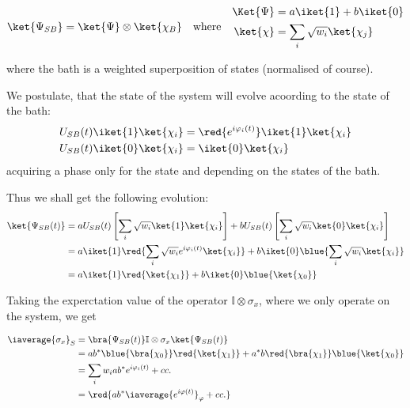    \begin{equation}\label{key}
     \ket{\Psi_{SB}} = \ket{\Psi} \otimes \ket{\chi_B} \quad\text{where}\quad
     \begin{aligned}
       \Ket{\Psi} & = a\iket{1} + b\iket{0}\\
       \ket{\chi} & = \sum_i\sqrt{w_i}\ket{\chi_j}
     \end{aligned}
   \end{equation}

   \noindent   where  the   bath   is  a   weighted  superposition   of
    states (normalised of course).

   \begin{framed}\noindent
     \noindent We postulate,  that the state of the  system will evolve
     acoording to the state of the bath:
     \begin{equation}\label{key}
       \begin{aligned}
         U_{SB}(t)\iket{1}\ket{\chi_i} & = \red{e^{i\varphi_i(t)}}\iket{1}\ket{\chi_i}\\
         U_{SB}(t)\iket{0}\ket{\chi_i} &=\iket{0}\ket{\chi_i}\\
       \end{aligned}
     \end{equation}
     \noindent  acquiring  a phase  only  for  the   state  and
     depending on the states of the bath.
   \end{framed}

   \noindent Thus we shall get the following evolution:
   \begin{equation}\label{key}
     \begin{aligned}
       \ket{\Psi_{SB}(t)} & = aU_{SB}(t)\left[\sum_i\sqrt{w_i}\ket{1}\ket{\chi_i}\right] + bU_{SB}(t)\left[\sum_i\sqrt{w_i}\ket{0}\ket{\chi_i}\right]\\
       & = a\iket{1}\red{\sum_i\sqrt{w_i}e^{i\varphi_i(t)}\ket{\chi_i}} + b\iket{0}\blue{\sum_i\sqrt{w_i}\ket{\chi_i}}\\
       & = a\iket{1}\red{\ket{\chi_1}} + b\iket{0}\blue{\ket{\chi_0}}
     \end{aligned}
   \end{equation}
   \vspace{1cm}

   \noindent   Taking   the   experctation  value   of   the   operator
   $ \mathbb{I} \otimes  \sigma_x $, where we only operate  on the system, we
   get

   \begin{equation}\label{key}
     \begin{aligned}
       \iaverage{\sigma_x}_S & = \bra{\Psi_{SB}(t)}\mathbb{I} \otimes \sigma_x\ket{\Psi_{SB}(t)} \\
       & = ab^{*}\blue{\bra{\chi_0}}\red{\ket{\chi_1}} + a^{*}b\red{\bra{\chi_1}}\blue{\ket{\chi_0}}\\
       & = \sum_iw_iab^{*}e^{i\varphi_i(t)} + cc.\\
       & = \red{ab^{*}\iaverage{e^{i\varphi(t)}}_\varphi + cc.}
     \end{aligned}
   \end{equation}

